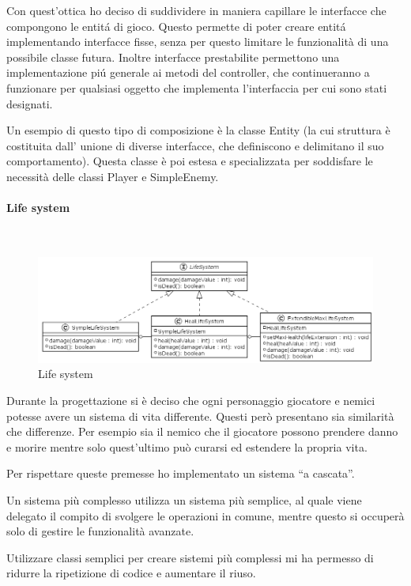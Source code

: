 \documentclass[a4paper,titlepage,12pt]{article}
\begin{document}
\par \noindent Con quest’ottica ho deciso di suddividere in maniera capillare le interfacce che compongono le entitá di gioco.  Questo permette di poter creare entitá implementando interfacce fisse, senza per questo limitare le funzionalità di una possibile classe futura. Inoltre interfacce prestabilite permettono una implementazione piú generale ai metodi del controller, che continueranno a funzionare per qualsiasi oggetto che implementa l’interfaccia per cui sono stati designati.
\par \noindent Un esempio di questo tipo di composizione è la classe Entity (la cui struttura è costituita dall’ unione di diverse interfacce, che definiscono e delimitano il suo comportamento). Questa classe è poi estesa e specializzata per soddisfare le necessità delle classi Player e SimpleEnemy.

\paragraph{Life system}
\par \noindent \\
\begin{figure}[H]
    \centering
    \includegraphics[scale=0.45]{img/uml/LifeSystem.png}
    \caption{Life system}
    \label{fig: Life system}
\end{figure}
\par \noindent Durante la progettazione si è deciso che ogni personaggio giocatore e nemici potesse avere un sistema di vita differente. Questi però presentano sia similarità che differenze. Per esempio sia il nemico che il giocatore possono prendere danno e morire mentre solo quest’ultimo può curarsi ed estendere la propria vita. 
\par \noindent Per rispettare queste premesse ho implementato un sistema “a cascata”. 
\par \noindent Un sistema più complesso utilizza un sistema più semplice, al quale viene delegato il compito di svolgere le operazioni in comune, mentre questo si occuperà solo di gestire le funzionalità avanzate.
\par \noindent Utilizzare classi semplici per creare sistemi più complessi mi ha permesso di ridurre la ripetizione di codice e aumentare il riuso.
\end{document}
